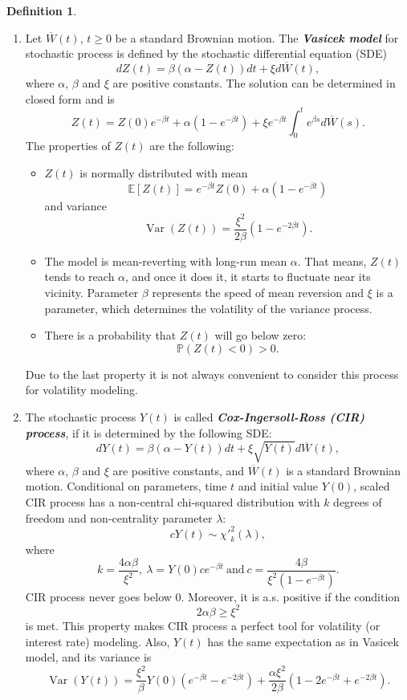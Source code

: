 \documentclass[a4paper,11pt]{book}
\theoremstyle{plain}
\theoremstyle{definition}
\newtheorem{defn}[thm]{Definition}
\newcommand{\ME}{\mathbb{E}}
\newcommand{\MP}{\mathbb{P}}
\newcommand{\Var}{\operatorname{Var}}
\newcommand{\define}[1]{\textit{\textbf{#1}}}
\begin{document}
    \begin{defn} \
    	\begin{enumerate}
    		\item 
    		Let $\overline{W}(t)$, $t \geq 0$ be a standard Brownian motion. The \define{Vasicek model} for stochastic process is defined by the stochastic differential equation (SDE)
    		\begin{equation} \label{Vasicek}
    		dZ(t) = \beta(\alpha - Z(t))dt + \xi d\overline{W}(t),
    		\end{equation}
    		where $\alpha$, $\beta$ and $\xi$ are positive constants. The solution can be determined in closed form and is
    		\[ Z(t) = Z(0) e^{-\beta t} + \alpha (1 - e^{-\beta t}) + \xi e^{-\beta t} \int_{0}^{t} e^{\beta s}d\overline{W}(s).\]
    		The properties of $Z(t)$ are the following:
    		\begin{itemize}
    			\item $Z(t)$ is normally distributed with mean
    			\[ \ME[Z(t)] = e^{-\beta t} Z(0) + \alpha(1-e^{-\beta t}) \]
    			and variance
    			\[ \Var(Z(t)) = \frac{\xi^2}{2\beta} (1-e^{-2\beta t}). \]
    			\item The model is mean-reverting with long-run mean $\alpha$. That means, $Z(t)$ tends to reach $\alpha$, and once it does it, it starts to fluctuate near its vicinity. Parameter $\beta$ represents the speed of mean reversion and $\xi$ is a parameter, which determines the volatility of the variance process.
    			\item There is a probability that $Z(t)$ will go below zero:
    			\[ \MP(Z(t) < 0) > 0. \]
    		\end{itemize}
    		Due to the last property it is not always convenient to consider this process for volatility modeling.
    		\item
    		The stochastic process $Y(t)$ is called \define{Cox-Ingersoll-Ross (CIR) process}, if it is determined by the following SDE:
    		\begin{equation} \label{CIR}
    		dY(t) = \beta(\alpha - Y(t))dt + \xi\sqrt{Y(t)}d \overline{W}(t),
    		\end{equation}
    		where $\alpha$, $\beta$ and $\xi$ are positive constants, and $\overline{W}(t)$ is a standard Brownian motion. Conditional on parameters, time $t$ and initial value $Y(0)$, scaled CIR process has a non-central chi-squared distribution with $k$ degrees of freedom and non-centrality parameter $\lambda$:
    		\[ c Y(t) \sim {\chi'}_k^2(\lambda),  \]
    		where
    		\[k = \frac{4\alpha \beta}{\xi^2},\ \lambda = Y(0) c e^{-\beta t} \ \text{and} \ c = \frac{4 \beta}{\xi^2 (1-e^{-\beta t})}.\]
    		CIR process never goes below $0$. Moreover, it is a.s. positive if the condition
    		\[ 2\alpha \beta \geq \xi^2  \]
    		is met. This property makes CIR process a perfect tool for volatility (or interest rate) modeling. Also, $Y(t)$ has the same expectation as in Vasicek model, and its variance is
    		\[ \Var(Y(t)) = \frac{\xi^2}{\beta} Y(0) (e^{-\beta t} - e^{-2\beta t}) + \frac{\alpha \xi^2}{2\beta}(1-2e^{-\beta t} + e^{-2\beta t}). \]
    		

\end{enumerate}
\end{defn}
\end{document}
